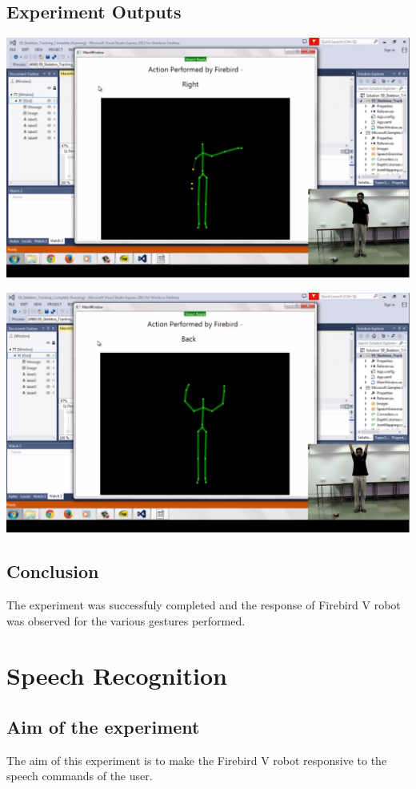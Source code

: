 \begin{flushleft}
\begin{enumerate}
\end{enumerate}
\medskip
\subsection{\textbf{ Experiment Outputs}}
\includegraphics[scale = 0.5]{e91}

\medskip
\includegraphics[scale = 0.5]{e92}
\medskip
\subsection{\textbf{ Conclusion}}
The experiment was successfuly completed and the response of Firebird V robot was observed for the various gestures performed.
\medskip
\newpage

\section{\textbf{ Speech Recognition}}
\label{4.10}

\medskip
\subsection{\textbf{ Aim of the experiment}}
The aim of this experiment is to make the Firebird V robot responsive to the speech commands of the user.
\medskip


\end{flushleft}
